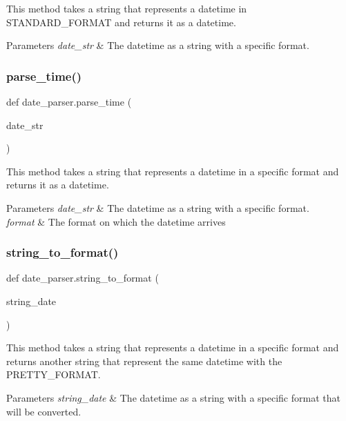 This method takes a string that represents a datetime in S\+T\+A\+N\+D\+A\+R\+D\+\_\+\+F\+O\+R\+M\+AT and returns it as a datetime. 


\begin{DoxyParams}{Parameters}
{\em date\+\_\+str} & The datetime as a string with a specific format. \\
\hline
\end{DoxyParams}
\mbox{\label{namespacedate__parser_ae2ebc5626493efaa6f55506c540cbf39}} 
\subsubsection{\texorpdfstring{parse\+\_\+time()}{parse\_time()}}
{\footnotesize\ttfamily def date\+\_\+parser.\+parse\+\_\+time (\begin{DoxyParamCaption}\item[{}]{date\+\_\+str }\end{DoxyParamCaption})}



This method takes a string that represents a datetime in a specific format and returns it as a datetime. 


\begin{DoxyParams}{Parameters}
{\em date\+\_\+str} & The datetime as a string with a specific format. \\
\hline
{\em format} & The format on which the datetime arrives \\
\hline
\end{DoxyParams}
\mbox{\label{namespacedate__parser_af75a6146e5b426c2256da4016a0e1d88}} 
\subsubsection{\texorpdfstring{string\+\_\+to\+\_\+format()}{string\_to\_format()}}
{\footnotesize\ttfamily def date\+\_\+parser.\+string\+\_\+to\+\_\+format (\begin{DoxyParamCaption}\item[{}]{string\+\_\+date }\end{DoxyParamCaption})}



This method takes a string that represents a datetime in a specific format and returns another string that represent the same datetime with the P\+R\+E\+T\+T\+Y\+\_\+\+F\+O\+R\+M\+AT. 


\begin{DoxyParams}{Parameters}
{\em string\+\_\+date} & The datetime as a string with a specific format that will be converted. \\
\hline
\end{DoxyParams}
